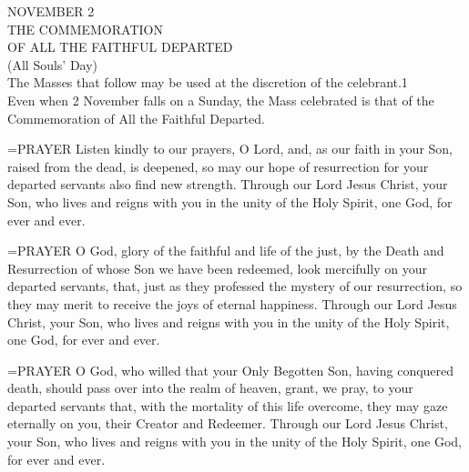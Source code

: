\begin{center}\normalsize NOVEMBER 2\\
\footnotesize THE COMMEMORATION\\
\footnotesize OF ALL THE FAITHFUL DEPARTED\\
\footnotesize (All Souls’ Day)\\
\footnotesize The Masses that follow may be used at the discretion of the celebrant.1\\
\footnotesize Even when 2 November falls on a Sunday, the Mass celebrated is that of the\\
\footnotesize Commemoration of All the Faithful Departed.\\
\end{center}

\hangindent=\parindent \small{PRAYER 
Listen kindly to our prayers, O Lord,
and, as our faith in your Son,
raised from the dead, is deepened,
so may our hope of resurrection for your departed servants
also find new strength.
Through our Lord Jesus Christ, your Son,
who lives and reigns with you in the unity of the Holy Spirit,
one God, for ever and ever.\\}
 
\hangindent=\parindent \small{PRAYER 
O God, glory of the faithful and life of the just,
by the Death and Resurrection of whose Son
we have been redeemed,
look mercifully on your departed servants,
that, just as they professed the mystery of our resurrection,
so they may merit to receive the joys of eternal happiness.
Through our Lord Jesus Christ, your Son,
who lives and reigns with you in the unity of the Holy Spirit,
one God, for ever and ever.\\}
 
\hangindent=\parindent \small{PRAYER 
O God, who willed that your Only Begotten Son,
having conquered death,
should pass over into the realm of heaven,
grant, we pray, to your departed servants
that, with the mortality of this life overcome,
they may gaze eternally on you,
their Creator and Redeemer.
Through our Lord Jesus Christ, your Son,
who lives and reigns with you in the unity of the Holy Spirit,
one God, for ever and ever.\\}
 
